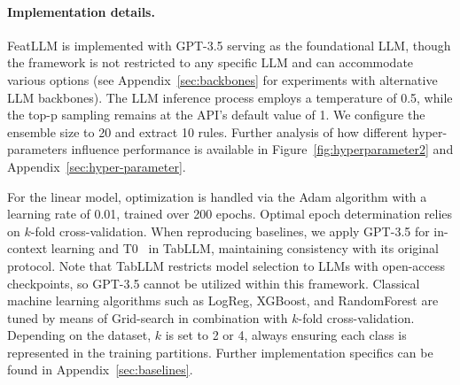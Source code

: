 \vspace*{-0.12in}
\paragraph{Implementation details.}
\textsf{FeatLLM} is implemented with GPT-3.5 serving as the foundational LLM, though the framework is not restricted to any specific LLM and can accommodate various options (see Appendix~\ref{sec:backbones} for experiments with alternative LLM backbones). The LLM inference process employs a temperature of 0.5, while the top-p sampling remains at the API’s default value of 1. We configure the ensemble size to 20 and extract 10 rules. Further analysis of how different hyper-parameters influence performance is available in Figure~\ref{fig:hyperparameter2} and Appendix~\ref{sec:hyper-parameter}.

For the linear model, optimization is handled via the Adam algorithm with a learning rate of 0.01, trained over 200 epochs. Optimal epoch determination relies on $k$-fold cross-validation. When reproducing baselines, we apply GPT-3.5 for in-context learning and T0~\cite{sanh2022multitask} in TabLLM, maintaining consistency with its original protocol. Note that TabLLM restricts model selection to LLMs with open-access checkpoints, so GPT-3.5 cannot be utilized within this framework. Classical machine learning algorithms such as LogReg, XGBoost, and RandomForest are tuned by means of Grid-search in combination with $k$-fold cross-validation. Depending on the dataset, $k$ is set to 2 or 4, always ensuring each class is represented in the training partitions. Further implementation specifics can be found in Appendix~\ref{sec:baselines}.

\vspace*{-0.12in}
